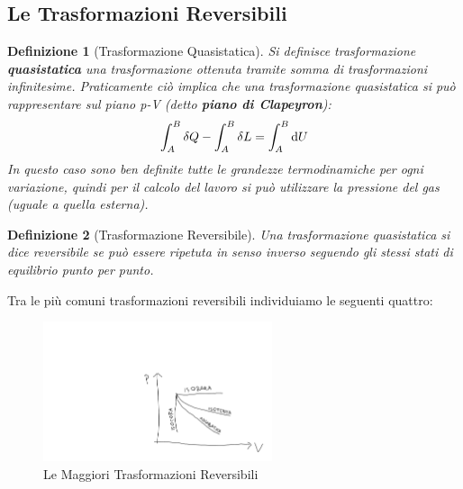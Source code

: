 \documentclass{article}
\newtheorem{defn}{Definizione}[section]
\begin{document}
\subsection{Le Trasformazioni Reversibili}
\begin{defn}[Trasformazione Quasistatica]
Si definisce trasformazione \textbf{quasistatica} una trasformazione ottenuta tramite somma di trasformazioni infinitesime. Praticamente ciò implica che una trasformazione quasistatica si può rappresentare sul piano p-V (detto \textbf{piano di Clapeyron}):
\[\int_A^B\delta Q-\int_A^B\delta L=\int_A^B\dif U\]
In questo caso sono ben definite tutte le grandezze termodinamiche per ogni variazione, quindi per il calcolo del lavoro si può utilizzare la pressione del gas (uguale a quella esterna). 
\end{defn}
\begin{defn}[Trasformazione Reversibile]
Una trasformazione quasistatica si dice reversibile se può essere ripetuta in senso inverso seguendo gli stessi stati di equilibrio punto per punto. 
\end{defn}
Tra le più comuni trasformazioni reversibili individuiamo le seguenti quattro:
\begin{figure}[H]
    \centering
    \includegraphics[width=0.6\textwidth]{TrasformazioniReversibili.png}
    \caption{Le Maggiori Trasformazioni Reversibili }
    \label{TrasfRevers}
\end{figure}
\end{document}
